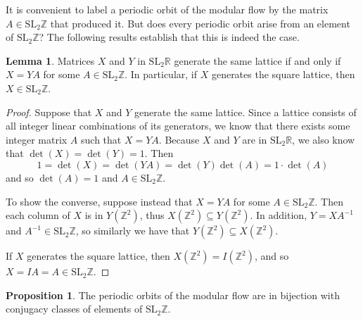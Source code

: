\documentclass[12pt,twoside]{reedthesis}
\theoremstyle{definition}
\newtheorem{lemma}[thm]{Lemma}
\newtheorem{prop}[thm]{Proposition}
\newcommand{\Z}{\mathbb{Z}}
\newcommand{\R}{\mathbb{R}}
\newcommand{\SLZ}{\mathrm{SL}_2{\Z}}
\newcommand{\SLR}{\mathrm{SL}_2{\R}}
\begin{document}
It is convenient to label a periodic orbit of the modular flow by the matrix $A \in \SLZ$ that produced it.
But does every periodic orbit arise from an element of $\SLZ$?
The following results establish that this is indeed the case.

\begin{lemma}\label{lemma:m_is_integer}
  Matrices $X$ and $Y$ in $\SLR$ generate the same lattice if and only if $X = YA$ for some $A \in \SLZ$.
  In particular, if $X$ generates the square lattice, then $X \in \SLZ$.
\end{lemma}

\begin{proof}
  Suppose that $X$ and $Y$ generate the same lattice.
  Since a lattice consists of all integer linear combinations of its generators, we know that there exists some integer matrix $A$ such that $X = YA$.
  Because $X$ and $Y$ are in $\SLR$, we also know that $\det(X) = \det(Y) = 1$. Then
  \begin{equation*}
    1 = \det(X) = \det(YA) = \det(Y)\det(A) = 1 \cdot \det(A)
  \end{equation*}
  and so $\det(A) = 1$ and $A \in \SLZ$.

  To show the converse, suppose instead that $X = YA$ for some $A \in \SLZ$.
  Then each column of $X$ is in $Y(\Z^2)$, thus $X(\Z^2) \subseteq Y(\Z^2)$.
  In addition, $Y = XA^{-1}$ and $A^{-1} \in \SLZ$, so similarly we have that $Y(\Z^2) \subseteq X(\Z^2)$.

  If $X$ generates the square lattice, then $X(\Z^2) = I(\Z^2)$, and so $X = IA = A \in \SLZ$.
\end{proof}

\begin{prop}
  The periodic orbits of the modular flow are in bijection with conjugacy classes of elements of $\SLZ$.
\end{prop}
\end{document}
